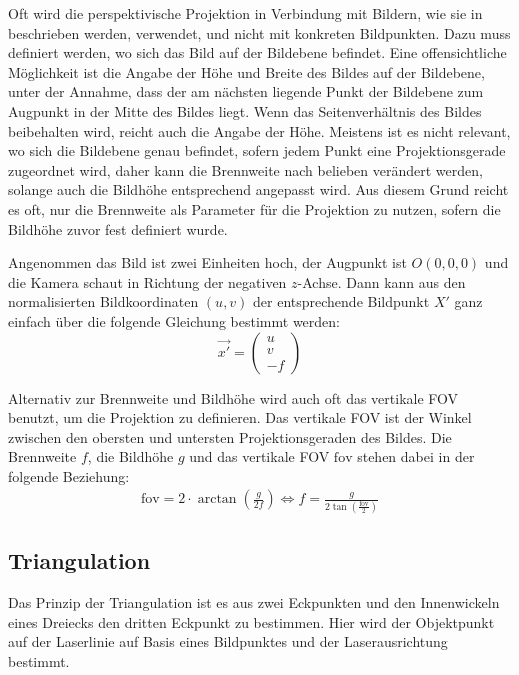 \documentclass[ngerman,a4paper,parskip=half]{scrartcl}
\def \fov{\mathrm{fov}}
\begin{document}
Oft wird die perspektivische Projektion in Verbindung mit Bildern, wie sie in  beschrieben werden, verwendet, und nicht mit konkreten Bildpunkten. Dazu muss definiert werden, wo sich das Bild auf der Bildebene befindet. Eine offensichtliche Möglichkeit ist die Angabe der Höhe und Breite des Bildes auf der Bildebene, unter der Annahme, dass der am nächsten liegende Punkt der Bildebene zum Augpunkt in der Mitte des Bildes liegt. Wenn das Seitenverhältnis des Bildes beibehalten wird, reicht auch die Angabe der Höhe. Meistens ist es nicht relevant, wo sich die Bildebene genau befindet, sofern jedem Punkt eine Projektionsgerade zugeordnet wird, daher kann die Brennweite nach belieben verändert werden, solange auch die Bildhöhe entsprechend angepasst wird. Aus diesem Grund reicht es oft, nur die Brennweite als Parameter für die Projektion zu nutzen, sofern die Bildhöhe zuvor fest definiert wurde.

Angenommen das Bild ist zwei Einheiten hoch, der Augpunkt ist $O(0,0,0)$ und die Kamera schaut in Richtung der negativen $z$-Achse. Dann kann aus den normalisierten Bildkoordinaten $(u,v)$ der entsprechende Bildpunkt $X'$ ganz einfach über die folgende Gleichung bestimmt werden:
\[ \vec{x'} = \begin{pmatrix}
u \\ v \\ -f
\end{pmatrix} \]

Alternativ zur Brennweite und Bildhöhe wird auch oft das vertikale \ac{FOV} benutzt, um die Projektion zu definieren. Das vertikale \ac{FOV} ist der Winkel zwischen den obersten und untersten Projektionsgeraden des Bildes. Die Brennweite $f$, die Bildhöhe $g$ und das vertikale \ac{FOV} $\fov$ stehen dabei in der folgende Beziehung:
\begin{align*}
	\fov = 2 \cdot \arctan \left( \frac{g}{2 f} \right)
	\Leftrightarrow f = \frac{g}{2 \tan\left(\frac{\fov}{2}\right)}
\end{align*}

\subsection{Triangulation}

Das Prinzip der Triangulation ist es aus zwei Eckpunkten und den Innenwickeln eines Dreiecks den dritten Eckpunkt zu bestimmen. Hier wird der Objektpunkt auf der Laserlinie auf Basis eines Bildpunktes und der Laserausrichtung bestimmt.
\end{document}
